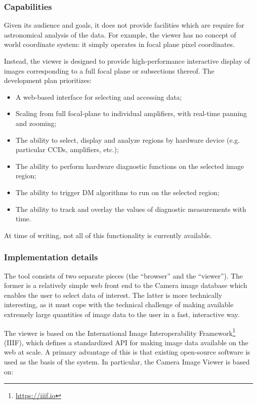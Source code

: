 \subsubsection{Capabilities}

Given its audience and goals, it does not provide facilities which are require for astronomical analysis of the data.
For example, the viewer has no concept of world coordinate system: it simply operates in focal plane pixel coordinates.

Instead, the viewer is designed to provide high-performance interactive display of images corresponding to a full focal plane or subsections thereof.
The development plan prioritizes:

\begin{itemize}

  \item{A web-based interface for selecting and accessing data;}
  \item{Scaling from full focal-plane to individual amplifiers, with real-time panning and zooming;}
  \item{The ability to select, display and analyze regions by hardware device (e.g. particular CCDs, amplifiers, etc.);}
  \item{The ability to perform hardware diagnostic functions on the selected image region;}
  \item{The ability to trigger DM algorithms to run on the selected region;}
  \item{The ability to track and overlay the values of diagnostic measurements with time.}

\end{itemize}

At time of writing, not all of this functionality is currently available.

\subsubsection{Implementation details}

The tool consists of two separate pieces (the ``browser'' and the ``viewer'').
The former is a relatively simple web front end to the Camera image database which enables the user to select data of interest.
The latter is more technically interesting, as it must cope with the technical challenge of making available extremely large quantities of image data to the user in a fast, interactive way.

The viewer is based on the International Image Interoperability Framework\footnote{\url{https://iiif.io}} (IIIF), which defines a standardized API for making image data available on the web at scale.
A primary advantage of this is that existing open-source software is used as the basis of the system.
In particular, the Camera Image Viewer is based on:

